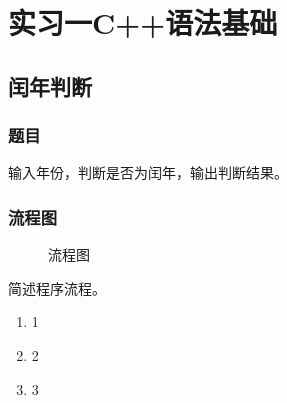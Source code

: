 
\section{实习一C++语法基础}
\subsection{闰年判断}
    \subsubsection{题目}
        输入年份，判断是否为闰年，输出判断结果。
    \subsubsection{流程图}
        \begin{figure}[H]
            \centering
            \caption{流程图}
        \end{figure}

        简述程序流程。
        \begin{enumerate}
            \item 1
            \item 2
            \item 3
        \end{enumerate}

